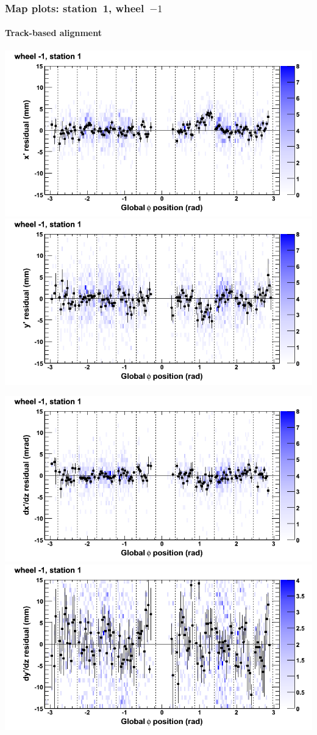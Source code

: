 \documentclass[compress]{beamer}
\begin{document}
\begin{frame}
\frametitle{Map plots: station~1, wheel~$-1$}
\framesubtitle{Track-based alignment}
\includegraphics[width=0.5\linewidth]{mapplots_re05/DTvsphi_st1whB_x.png}
\includegraphics[width=0.5\linewidth]{mapplots_re05/DTvsphi_st1whB_y.png}

\includegraphics[width=0.5\linewidth]{mapplots_re05/DTvsphi_st1whB_dxdz.png}
\includegraphics[width=0.5\linewidth]{mapplots_re05/DTvsphi_st1whB_dydz.png}
\end{frame}
\end{document}
